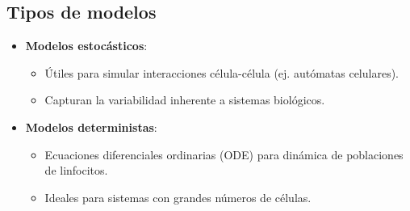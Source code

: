 \subsection{Tipos de modelos}
\begin{itemize}
    \item \textbf{Modelos estocásticos}: 
    \begin{itemize}
        \item Útiles para simular interacciones célula-célula (ej. autómatas celulares).
        \item Capturan la variabilidad inherente a sistemas biológicos.
    \end{itemize}
    
    \item \textbf{Modelos deterministas}:
    \begin{itemize}
        \item Ecuaciones diferenciales ordinarias (ODE) para dinámica de poblaciones de linfocitos.
        \item Ideales para sistemas con grandes números de células.
    \end{itemize}
\end{itemize}

